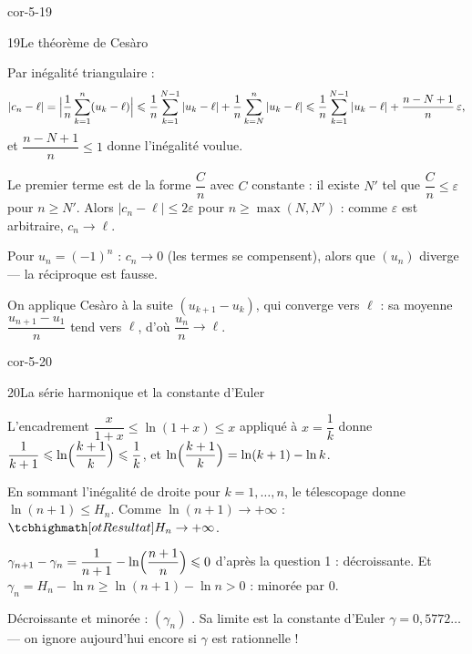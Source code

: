 \begin{blocLivre}{cor-5-19}
\begin{corrige}{19}{Le théorème de Cesàro}
\begin{questions}
  \item Par inégalité triangulaire :
    \[
      |c_n-\ell|=\Bigl|\frac1n\sum_{k=1}^{n}(u_k-\ell)\Bigr|
      \leq\frac1n\sum_{k=1}^{N-1}|u_k-\ell|+\frac1n\sum_{k=N}^{n}|u_k-\ell|
      \leq\frac1n\sum_{k=1}^{N-1}|u_k-\ell|+\frac{n-N+1}{n}\,\varepsilon,
    \]
    et $\dfrac{n-N+1}{n}\leq1$ donne l'inégalité voulue.
  \item Le premier terme est de la forme $\dfrac{C}{n}$ avec $C$ constante :
    il existe $N'$ tel que $\dfrac{C}{n}\leq\varepsilon$ pour $n\geq N'$.
    Alors $|c_n-\ell|\leq2\varepsilon$ pour $n\geq\max(N,N')$ : comme
    $\varepsilon$ est arbitraire, $c_n\to\ell$.
  \item Pour $u_n=(-1)^{n}$ : $c_n\to0$ (les termes se compensent), alors
    que $(u_n)$ diverge — la réciproque est fausse.
  \item On applique Cesàro à la suite $(u_{k+1}-u_k)$, qui converge vers
    $\ell$ : sa moyenne $\dfrac{u_{n+1}-u_1}{n}$ tend vers $\ell$, d'où
    $\dfrac{u_n}{n}\to\ell$.
\end{questions}
\end{corrige}
\end{blocLivre}

\begin{blocLivre}{cor-5-20}
\begin{corrige}{20}{La série harmonique et la constante d'Euler}
\begin{questions}
  \item L'encadrement $\dfrac{x}{1+x}\leq\ln(1+x)\leq x$ appliqué à
    $x=\dfrac1k$ donne
    $\dfrac{1}{k+1}\leq\ln\Bigl(\dfrac{k+1}{k}\Bigr)\leq\dfrac1k$, et
    $\ln\Bigl(\dfrac{k+1}{k}\Bigr)=\ln(k+1)-\ln k$.
  \item En sommant l'inégalité de droite pour $k=1,\dots,n$, le télescopage
    donne $\ln(n+1)\leq H_n$. Comme $\ln(n+1)\to+\infty$ :
    $\res{H_n\to+\infty}$.
  \item $\gamma_{n+1}-\gamma_n=\dfrac{1}{n+1}-\ln\Bigl(\dfrac{n+1}{n}\Bigr)\leq0$
    d'après la question 1 : décroissante. Et
    $\gamma_n=H_n-\ln n\geq\ln(n+1)-\ln n>0$ : minorée par $0$.
  \item Décroissante et minorée : $(\gamma_n)$ . Sa
    limite est la constante d'Euler $\gamma=0{,}5772\dots$ — on ignore
    aujourd'hui encore si $\gamma$ est rationnelle !
\end{questions}
\end{corrige}
\end{blocLivre}

